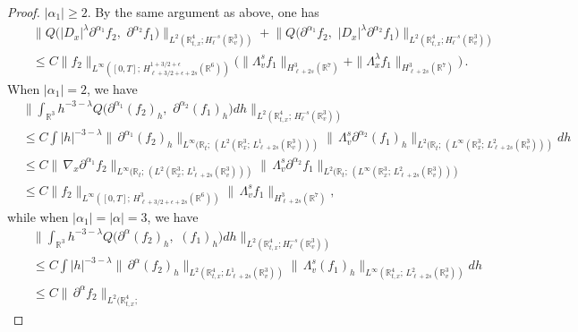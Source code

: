 \documentclass{amsart}[12pt, article]
\begin{document}
\begin{proof}
  $|\alpha_1|\geq 2$. By the same argument as
above, one has
\begin{eqnarray*}
&&\Big\|Q\Big(|D_{x}|^\lambda\partial^{\alpha_1} f_2,\,\,
\partial^{\alpha_2} f_1\Big)\Big\|_{L^2({{{\mathbb R}}}^4_{t, x}; H^{-s}_{\ell}({{{\mathbb R}}}^3_v))}
+\Big\|Q\Big(\partial^{\alpha_1} f_2,\,\, |D_{x}|^\lambda
\partial^{\alpha_2} f_1\Big)\Big\|_{L^2({{{\mathbb R}}}^4_{t, x};
H^{-s}_{\ell}({{{\mathbb R}}}^3_v))}\\
&&\leq C\|f_2\|_{L^\infty([0,
T];\,H^{1+3/2+\epsilon}_{\ell+3/2+\epsilon+2s}({{{\mathbb R}}}^6))}\Big(\|\Lambda_v^s
f_1\|_{H^{3}_{\ell +2s}({{{\mathbb R}}}^7)}+\|\Lambda_x^\lambda
f_1\|_{H^{3}_{\ell +2s}({{{\mathbb R}}}^7)}\Big)\,.
\end{eqnarray*}
When $|\alpha_1|= 2$, we have
\begin{align*}
&\Big\|\int_{{{{\mathbb R}}}^3}h^{-3-\lambda}Q\Big(\partial^{\alpha_1}
(f_2)_h,\,\,
\partial^{\alpha_2} (f_1)_h\Big) dh\Big\|_{L^2({{{\mathbb R}}}^4_{t, x};\,
H^{-s}_{\ell}({{{\mathbb R}}}^3_v))}\\
&\leq C\int |h|^{-3-\lambda}\|\,\partial^{\alpha_1}
(f_2)_h\|_{L^\infty({{{\mathbb R}}}_t;\, (L^2({{{\mathbb R}}}^3_{x};\, L^1_{\ell
+2s}({{{\mathbb R}}}^3_v)))}\|\,\Lambda_v^{s}
\partial^{\alpha_2} (f_1)_h\|_{L^2({{{\mathbb R}}}_t;\, (L^\infty({{{\mathbb R}}}^3_{x};\,
L^2_{\ell +2s}({{{\mathbb R}}}^3_v)))}dh\\
&\leq C\|\,\nabla_{x}\partial^{\alpha_1} f_2\|_{L^\infty({{{\mathbb R}}}_t;\,
(L^2({{{\mathbb R}}}^3_{x};\, L^1_{\ell +2s}({{{\mathbb R}}}^3_v)))}\|\,\Lambda_v^{s}
\partial^{\alpha_2} f_1\|_{L^2({{{\mathbb R}}}_t;\, (L^\infty({{{\mathbb R}}}^3_{x};\, L^2_{\ell +2s}({{{\mathbb R}}}^3_v)))}
\\
&\leq C\|f_2\|_{L^\infty([0, T];\, H^{3}_{\ell+3/2+\epsilon
+2s}({{{\mathbb R}}}^6))} \|\,\Lambda_v^{s}f_1\|_{H^{3}_{\ell +2s}({{{\mathbb R}}}^7)},
\end{align*}
while when $|\alpha_1|= |\alpha|=3$, we have
\begin{eqnarray*}
&&\Big\|\int_{{{{\mathbb R}}}^3}h^{-3-\lambda}Q\Big(\partial^{\alpha}
(f_2)_h,\,\,
(f_1)_h\Big) dh\Big\|_{L^2({{{\mathbb R}}}^4_{t, x}; H^{-s}_{\ell}({{{\mathbb R}}}^3_v))}\\
&&\leq C\int |h|^{-3-\lambda}\|\,\partial^{\alpha}
(f_2)_h\|_{L^2({{{\mathbb R}}}^4_{t, x}; L^1_{\ell
+2s}({{{\mathbb R}}}^3_v))}\|\,\Lambda_v^{s}
(f_1)_h\|_{L^\infty({{{\mathbb R}}}^4_{t, x};\, L^2_{\ell+2s}({{{\mathbb R}}}^3_v))}dh\\
&&\leq C\|\,\partial^{\alpha} f_2\|_{L^2({{{\mathbb R}}}^4_{t, x};\,
}
\end{eqnarray*}
\end{proof}
\end{document}
